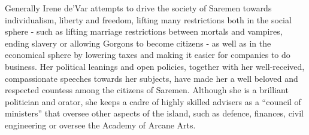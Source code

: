 Generally Irene de'Var attempts to drive the society of Saremen towards
individualism, liberty and freedom, lifting many restrictions both in the
social sphere - such as lifting marriage restrictions between mortals and
vampires, ending slavery or allowing Gorgons to become citizens - as well as
in the economical sphere by lowering taxes and making it easier for companies
to do business. Her political leanings and open policies, together with her
well-received, compassionate speeches towards her subjects, have made her a
well beloved and respected countess among the citizens of Saremen. Although
she is a brilliant politician and orator, she keeps a cadre of highly skilled
advisers as a ``council of ministers'' that oversee other aspects of the
island, such as defence, finances, civil engineering or oversee the Academy of
Arcane Arts.

